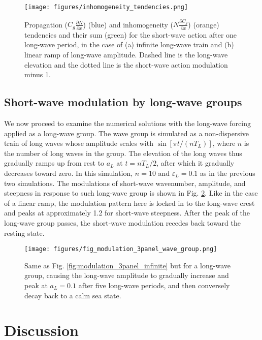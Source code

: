 \documentclass[lineno]{jfm}
\begin{document}
\begin{figure}
  \centering
  \texttt{[image: figures/inhomogeneity\_tendencies.png]}
  \caption{
    Propagation ($C_g \frac{\partial N}{\partial x}$) (blue) and inhomogeneity
    ($N \frac{\partial C_g}{\partial x}$) (orange) tendencies and their sum
    (green) for the short-wave action after one long-wave period, in the case of
    (a) infinite long-wave train and (b) linear ramp of long-wave amplitude.
    Dashed line is the long-wave elevation and the dotted line is the short-wave
    action modulation minus 1.
  }
  \label{fig:inhomogeneity_tendencies}
\end{figure}

\subsection{Short-wave modulation by long-wave groups}
\label{subsection:wave_groups}

We now proceed to examine the numerical solutions with the long-wave forcing
applied as a long-wave group.
The wave group is simulated as a non-dispersive train of long waves whose
amplitude scales with $\sin[\pi t / (n T_L)]$, where $n$ is the number of
long waves in the group.
The elevation of the long waves thus gradually ramps up from rest to $a_L$ at
$t = n T_L / 2$, after which it gradually decreases toward zero.
In this simulation, $n = 10$ and $\varepsilon_L = 0.1$ as in the previous two
simulations.
The modulations of short-wave wavenumber, amplitude, and steepness in response
to such long-wave group is shown in Fig. \ref{fig:modulation_3panel_groups}.
Like in the case of a linear ramp, the modulation pattern here is locked in to
the long-wave crest and peaks at approximately 1.2 for short-wave steepness.
After the peak of the long-wave group passes, the short-wave modulation recedes
back toward the resting state.

\begin{figure}
\centering
\texttt{[image: figures/fig\_modulation\_3panel\_wave\_group.png]}
\caption{
  Same as Fig. \ref{fig:modulation_3panel_infinite} but for a long-wave group,
  causing the long-wave amplitude to gradually increase and peak at $a_L = 0.1$
  after five long-wave periods, and then conversely decay back to a calm sea state.
}
\label{fig:modulation_3panel_groups}
\end{figure}

\section{Discussion}
\label{section:discussion}
\end{document}
